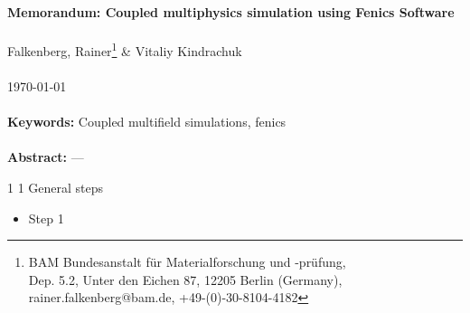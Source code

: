 \documentclass[11pt,a4paper]{article}
\makeatletter
\renewcommand\section{\@startsection
   {section}{1}{0mm}%
   {1\baselineskip}%
   {1\baselineskip}%
   {\bfseries\bf\normalsize}%
   }
\makeatother
\begin{document}
%
{\large\bf\textsf{Memorandum: Coupled multiphysics simulation using Fenics Software}}\\\\
{\textsf{Falkenberg, Rainer\footnote{BAM Bundesanstalt f\"ur Materialforschung und -pr\"ufung,\\Dep. 5.2, Unter den Eichen 87, 12205 Berlin (Germany),\\ rainer.falkenberg@bam.de, +49-(0)-30-8104-4182}} \& Vitaliy Kindrachuk\footnotemark[1]}\\\\
\today\\\\
%
{\normalsize\bf\textsf{Keywords:}} \textsf{Coupled multifield simulations, fenics}\\\\
{\normalsize\bf\textsf{Abstract:}} ---
%
%
\section{General steps}
%
\begin{itemize}[nosep]
\item Step 1
\end{itemize}

%
%
%
%
%
\end{document}
